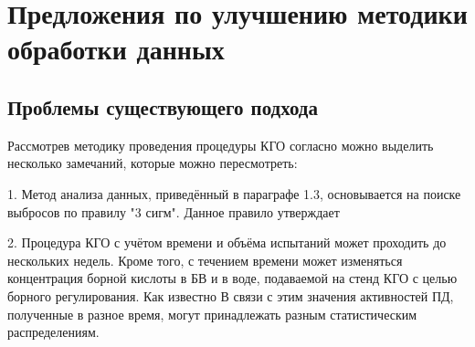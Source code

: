 \section{Предложения по улучшению методики обработки данных}

\subsection{Проблемы существующего подхода}
Рассмотрев методику проведения процедуры КГО согласно\cite{RD} можно выделить несколько замечаний, которые можно пересмотреть:

1. Метод анализа данных, приведённый в параграфе 1.3, основывается на поиске выбросов по правилу "3 сигм". Данное правило утверждает 

2. Процедура КГО с учётом времени и объёма испытаний может проходить до нескольких недель. Кроме того, с течением времени может изменяться концентрация борной кислоты в БВ и в воде, подаваемой на стенд КГО с целью борного регулирования. Как известно 
В связи с этим значения активностей ПД, полученные в разное время, могут принадлежать разным статистическим распределениям.


